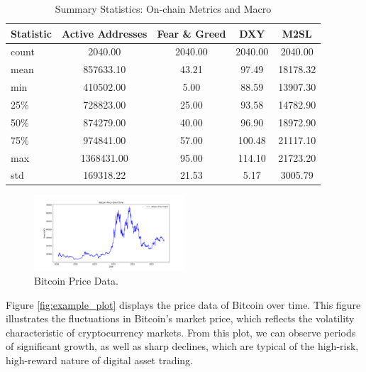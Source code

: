 \begin{table}[ht]
    \centering
    \begin{tabular}{|l|c|c|c|c|}
    \hline
    Statistic & Active Addresses & Fear \& Greed & DXY     & M2SL     \\ \hline
    count     & 2040.00          & 2040.00       & 2040.00 & 2040.00  \\ \hline
    mean      & 857633.10        & 43.21         & 97.49   & 18178.32 \\ \hline
    min       & 410502.00        & 5.00          & 88.59   & 13907.30 \\ \hline
    25\%      & 728823.00        & 25.00         & 93.58   & 14782.90 \\ \hline
    50\%      & 874279.00        & 40.00         & 96.90   & 18972.90 \\ \hline
    75\%      & 974841.00        & 57.00         & 100.48  & 21117.10 \\ \hline
    max       & 1368431.00       & 95.00         & 114.10  & 21723.20 \\ \hline
    std       & 169318.22        & 21.53         & 5.17    & 3005.79  \\ \hline
    \end{tabular}
    \caption{Summary Statistics: On-chain Metrics and Macro}
    \label{tab:on_chain_metrics}
\end{table}

\begin{figure}[h]
    \centering
    \includegraphics[width=0.5\textwidth]{plots/bitcoin_price_plot.png} %
    \caption{Bitcoin Price Data.}
    \label{fig:bitcoin_price}
\end{figure}

Figure \ref{fig:example_plot} displays the price data of Bitcoin over time. This figure illustrates the fluctuations
in Bitcoin's market price, which reflects the volatility characteristic of cryptocurrency markets. From this plot,
we can observe periods of significant growth, as well as sharp declines, which are typical of the high-risk,
high-reward nature of digital asset trading.


